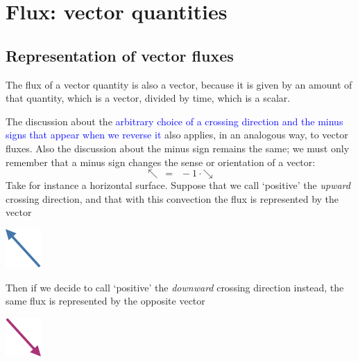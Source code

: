\documentclass[a4paper,12pt,%
onecolumn,oneside,titlepage,%
british%
]{memoir}
\renewcommand*{\|}[1][]{\nonscript\:#1\vert\nonscript\:\mathopen{}}
\newcommand*{\sect}{\S}%
\renewcommand*{\autoref}[2]{\sidepar{\vspace{-1ex}\footnotesize{\color{blue}\faIcon{%
reply%
}\enspace\sect\,\ref{#1} page\,\pageref{#1}}}\textcolor{blue}{#2}}
\begin{document}
\section{Flux: vector quantities}
\label{sec:intuition_fluxes_vector}

\subsection{Representation of vector fluxes}
\label{sec:flux_vector_direction}

The flux of a vector quantity is also a vector, because it is given by an amount of that quantity, which is a vector, divided by time, which is a scalar.

The discussion about the \autoref{sec:flux_scalar_direction}{arbitrary choice of a crossing direction and the minus signs that appear when we reverse it} also applies, in an analogous way, to vector fluxes. Also the discussion about the minus sign remains the same; we must only remember that a minus sign changes the sense or orientation of a vector:
\begin{equation*}
  \mathord{\nwarrow} \mathrel{\enspace=\enspace} -1\cdot\mathord{\searrow}
\end{equation*}
Take for instance a horizontal surface. Suppose that we call \enquote*{positive} the \emph{upward} crossing direction, and that with this convection the flux is represented by the vector
\begin{center}
  \includegraphics[height=4em]{images/vec_NW.pdf}
\end{center}
Then if we decide to call \enquote*{positive} the \emph{downward} crossing direction instead, the same flux is represented by the opposite vector
\begin{center}
  \includegraphics[height=4em]{images/vec_SE.pdf}
\end{center}
\end{document}
